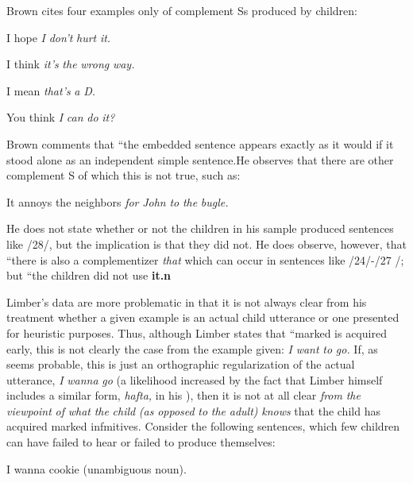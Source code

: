 
Brown cites four examples only of complement Ss produced by children:

\ea\label{ex:24}
 I hope \textit{I} \textit{don't} \textit{hurt} \textit{it.}
\glt
\z

\ea\label{ex:25}
 I think \textit{it's} \textit{the} \textit{wrong} \textit{way.}
\glt
\z

\ea\label{ex:26}
 I mean \textit{that's} \textit{a} \textit{D.}
\glt
\z

\ea\label{ex:27}
 You think \textit{I} \textit{can} \textit{do} \textit{it?}
\glt
\z

Brown comments that ``the embedded sentence appears exactly as it would if it stood alone as an independent simple sentence.{\textquotedbl}He observes that there are other  complement S of which this is not true, such as:

\ea\label{ex:28}
 It annoys the neighbors \textit{for} \textit{John} \textit{to} \textit{ the} \textit{bugle.}
\glt
\z

He does not state whether or not the children in his sample produced sentences like /28/, but the implication is that they did not. He does observe, however, that ``there is also a complementizer \textit{that{\textquotedbl}} which can occur in sentences like /24/-/27 /; but ``the children did not use \textbf{it.n}

Limber's data are more problematic in that it is not always clear from his treatment whether a given example is an actual child utterance or one presented for heuristic purposes. Thus, although Limber states that ``marked  is acquired early, this is not clearly the case from the example given: \textit{I} \textit{want} \textit{to} \textit{go.} If, as seems probable, this is just an orthographic regularization of the actual utterance, \textit{I} \textit{wanna} \textit{go} (a likelihood increased by the fact that Limber himself includes a similar form, \textit{h}\textit{a}\textit{fta,} in his ), then it is not at all clear \textit{from} \textit{the} \textit{viewpoint} \textit{of} \textit{what} \textit{the} \textit{child }\textit{(as} \textit{opposed} \textit{to} \textit{the} \textit{adult)} \textit{knows} that the child has acquired marked infmitives. Consider the following sentences, which few children can have failed to hear or failed to produce themselves:

\ea\label{ex:29}
 I wanna cookie (unambiguous noun).
\glt
\z

